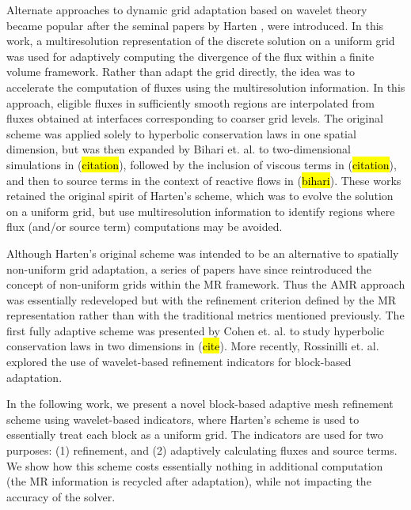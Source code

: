 \documentclass[]{article}
\begin{document}
    Alternate approaches to dynamic grid adaptation based on wavelet theory
    became popular after the seminal papers by Harten \cite{harten1994}, were
    introduced. In this work, a multiresolution representation of the discrete
    solution on a uniform grid was used for adaptively computing the divergence
    of the flux within a finite volume framework. Rather than adapt the grid
    directly, the idea was to accelerate the computation of fluxes using the
    multiresolution information. In this approach, eligible fluxes in
    sufficiently smooth regions are interpolated from fluxes obtained at
    interfaces corresponding to coarser grid levels. The original scheme was
    applied solely to hyperbolic conservation laws in one spatial dimension, but
    was then expanded by Bihari et. al. to two-dimensional simulations in
    (\hl{citation}), followed by the inclusion of viscous terms in
    (\hl{citation}), and then to source terms in the context of reactive flows
    in (\hl{bihari}). These works retained the original spirit of Harten's
    scheme, which was to evolve the solution on a uniform grid, but use
    multiresolution information to identify regions where flux (and/or source
    term) computations may be avoided.

    Although Harten's original scheme was intended to be an alternative to
    spatially non-uniform grid adaptation, a series of papers have since
    reintroduced the concept of non-uniform grids within the MR framework. Thus
    the AMR approach was essentially redeveloped but with the refinement
    criterion defined by the MR representation rather than with the traditional
    metrics mentioned previously. The first fully adaptive scheme was presented
    by Cohen et. al. to study hyperbolic conservation laws in two dimensions in
    (\hl{cite}). More recently, Rossinilli et. al. explored the use of
    wavelet-based refinement indicators for block-based adaptation.

    In the following work, we present a novel block-based adaptive mesh
    refinement scheme using wavelet-based indicators, where Harten's scheme is
    used to essentially treat each block as a uniform grid.  The indicators are
    used for two purposes: (1) refinement, and (2) adaptively calculating fluxes
    and source terms. We show how this scheme costs essentially nothing in
    additional computation (the MR information is recycled after adaptation),
    while not impacting the accuracy of the solver.
\end{document}
